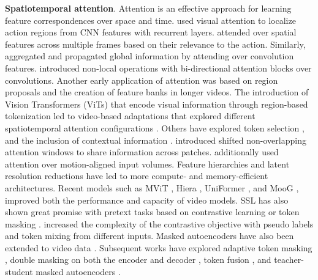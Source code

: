 \noindent
\textbf{Spatiotemporal attention}. Attention is an effective approach for learning feature correspondences over space and time.  used visual attention to localize action regions from CNN features with recurrent layers.  attended over spatial features across multiple frames based on their relevance to the action. Similarly,  aggregated and propagated global information by attending over convolution features.  introduced non-local operations with bi-directional attention blocks over convolutions. Another early application of attention  was based on region proposals and the creation of feature banks  in longer videos. The introduction of Vision Transformers (ViTs)  that encode visual information through region-based tokenization led to video-based adaptations that explored different spatiotemporal attention configurations . Others have explored token selection , and the inclusion of contextual information .  introduced shifted non-overlapping attention windows to share information across patches.  additionally used attention over motion-aligned input volumes. Feature hierarchies and latent resolution reductions have led to more compute-  and memory-efficient  architectures. Recent models such as MViT , Hiera , UniFormer , and MooG , improved both the performance and capacity of video models. SSL has also shown great promise with pretext tasks based on contrastive learning  or token masking .  increased the complexity of the contrastive objective with pseudo labels and token mixing from different inputs. Masked autoencoders have also been extended to video data . Subsequent works have explored adaptive token masking , double masking on both the encoder and decoder , token fusion , and teacher-student masked autoencoders .


